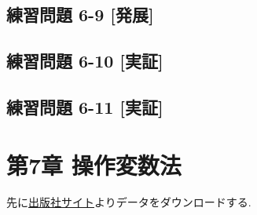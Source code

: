 \documentclass[
]{book}
\begin{document}
\hypertarget{ux7df4ux7fd2ux554fux984c-6-9-ux767aux5c55}{%
\section*{練習問題 6-9 {[}発展{]}}\label{ux7df4ux7fd2ux554fux984c-6-9-ux767aux5c55}}

\hypertarget{ux7df4ux7fd2ux554fux984c-6-10-ux5b9fux8a3c}{%
\section*{練習問題 6-10 {[}実証{]}}\label{ux7df4ux7fd2ux554fux984c-6-10-ux5b9fux8a3c}}

\hypertarget{ux7df4ux7fd2ux554fux984c-6-11-ux5b9fux8a3c}{%
\section*{練習問題 6-11 {[}実証{]}}\label{ux7df4ux7fd2ux554fux984c-6-11-ux5b9fux8a3c}}

\hypertarget{ch7}{%
\chapter*{第7章 操作変数法}\label{ch7}}

先に\href{https://www.yuhikaku.co.jp/books/detail/9784641053854}{出版社サイト}よりデータをダウンロードする.
\end{document}
